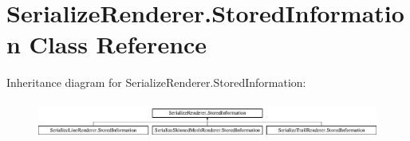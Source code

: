 \hypertarget{class_serialize_renderer_1_1_stored_information}{}\section{Serialize\+Renderer.\+Stored\+Information Class Reference}
\label{class_serialize_renderer_1_1_stored_information}
Inheritance diagram for Serialize\+Renderer.\+Stored\+Information\+:\begin{figure}[H]
\begin{center}
\leavevmode
\includegraphics[height=1.240310cm]{class_serialize_renderer_1_1_stored_information}
\end{center}
\end{figure}
